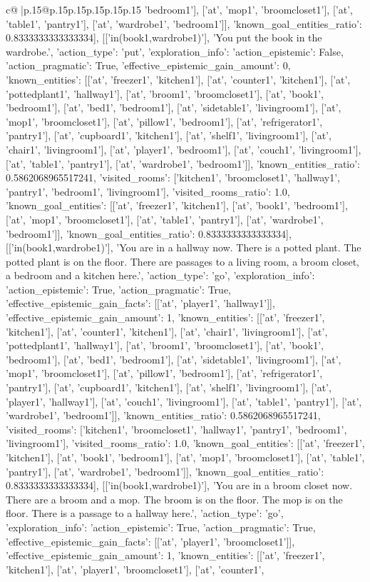 \documentclass{article}
\begin{document}
{\begin{supertabular}{c@{$\;$}|p{.15\linewidth}@{}p{.15\linewidth}p{.15\linewidth}p{.15\linewidth}p{.15\linewidth}p{.15\linewidth}}
{{{'bedroom1'], ['at', 'mop1', 'broomcloset1'], ['at', 'table1', 'pantry1'], ['at', 'wardrobe1', 'bedroom1']], 'known_goal_entities_ratio': 0.8333333333333334}}], [['in(book1,wardrobe1)'], 'You put the book in the wardrobe.', {'action_type': 'put', 'exploration_info': {'action_epistemic': False, 'action_pragmatic': True, 'effective_epistemic_gain_amount': 0, 'known_entities': [['at', 'freezer1', 'kitchen1'], ['at', 'counter1', 'kitchen1'], ['at', 'pottedplant1', 'hallway1'], ['at', 'broom1', 'broomcloset1'], ['at', 'book1', 'bedroom1'], ['at', 'bed1', 'bedroom1'], ['at', 'sidetable1', 'livingroom1'], ['at', 'mop1', 'broomcloset1'], ['at', 'pillow1', 'bedroom1'], ['at', 'refrigerator1', 'pantry1'], ['at', 'cupboard1', 'kitchen1'], ['at', 'shelf1', 'livingroom1'], ['at', 'chair1', 'livingroom1'], ['at', 'player1', 'bedroom1'], ['at', 'couch1', 'livingroom1'], ['at', 'table1', 'pantry1'], ['at', 'wardrobe1', 'bedroom1']], 'known_entities_ratio': 0.5862068965517241, 'visited_rooms': ['kitchen1', 'broomcloset1', 'hallway1', 'pantry1', 'bedroom1', 'livingroom1'], 'visited_rooms_ratio': 1.0, 'known_goal_entities': [['at', 'freezer1', 'kitchen1'], ['at', 'book1', 'bedroom1'], ['at', 'mop1', 'broomcloset1'], ['at', 'table1', 'pantry1'], ['at', 'wardrobe1', 'bedroom1']], 'known_goal_entities_ratio': 0.8333333333333334}}], [['in(book1,wardrobe1)'], 'You are in a hallway now. There is a potted plant. The potted plant is on the floor. There are passages to a living room, a broom closet, a bedroom and a kitchen here.', {'action_type': 'go', 'exploration_info': {'action_epistemic': True, 'action_pragmatic': True, 'effective_epistemic_gain_facts': [['at', 'player1', 'hallway1']], 'effective_epistemic_gain_amount': 1, 'known_entities': [['at', 'freezer1', 'kitchen1'], ['at', 'counter1', 'kitchen1'], ['at', 'chair1', 'livingroom1'], ['at', 'pottedplant1', 'hallway1'], ['at', 'broom1', 'broomcloset1'], ['at', 'book1', 'bedroom1'], ['at', 'bed1', 'bedroom1'], ['at', 'sidetable1', 'livingroom1'], ['at', 'mop1', 'broomcloset1'], ['at', 'pillow1', 'bedroom1'], ['at', 'refrigerator1', 'pantry1'], ['at', 'cupboard1', 'kitchen1'], ['at', 'shelf1', 'livingroom1'], ['at', 'player1', 'hallway1'], ['at', 'couch1', 'livingroom1'], ['at', 'table1', 'pantry1'], ['at', 'wardrobe1', 'bedroom1']], 'known_entities_ratio': 0.5862068965517241, 'visited_rooms': ['kitchen1', 'broomcloset1', 'hallway1', 'pantry1', 'bedroom1', 'livingroom1'], 'visited_rooms_ratio': 1.0, 'known_goal_entities': [['at', 'freezer1', 'kitchen1'], ['at', 'book1', 'bedroom1'], ['at', 'mop1', 'broomcloset1'], ['at', 'table1', 'pantry1'], ['at', 'wardrobe1', 'bedroom1']], 'known_goal_entities_ratio': 0.8333333333333334}}], [['in(book1,wardrobe1)'], 'You are in a broom closet now. There are a broom and a mop. The broom is on the floor. The mop is on the floor. There is a passage to a hallway here.', {'action_type': 'go', 'exploration_info': {'action_epistemic': True, 'action_pragmatic': True, 'effective_epistemic_gain_facts': [['at', 'player1', 'broomcloset1']], 'effective_epistemic_gain_amount': 1, 'known_entities': [['at', 'freezer1', 'kitchen1'], ['at', 'player1', 'broomcloset1'], ['at', 'counter1', }}}
\end{supertabular}}
\end{document}
